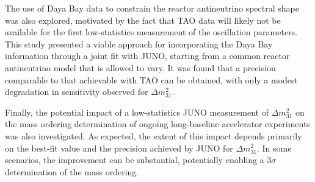 The use of Daya Bay data to constrain the reactor antineutrino spectral shape was also explored, motivated by the fact that TAO data will likely not be available for the first low-statistics measurement of the oscillation parameters. This study presented a viable approach for incorporating the Daya Bay information through a joint fit with JUNO, starting from a common reactor antineutrino model that is allowed to vary. It was found that a precision comparable to that achievable with TAO can be obtained, with only a modest degradation in sensitivity observed for $\Delta m^2_{31}$. 

Finally, the potential impact of a low-statistics JUNO measurement of $\Delta m^2_{31}$ on the mass ordering determination of ongoing long-baseline accelerator experiments was also investigated. As expected, the extent of this impact depends primarily on the best-fit value and the precision achieved by JUNO for $\Delta m^2_{31}$. In some scenarios, the improvement can be substantial, potentially enabling a $3\sigma$ determination of the mass ordering.